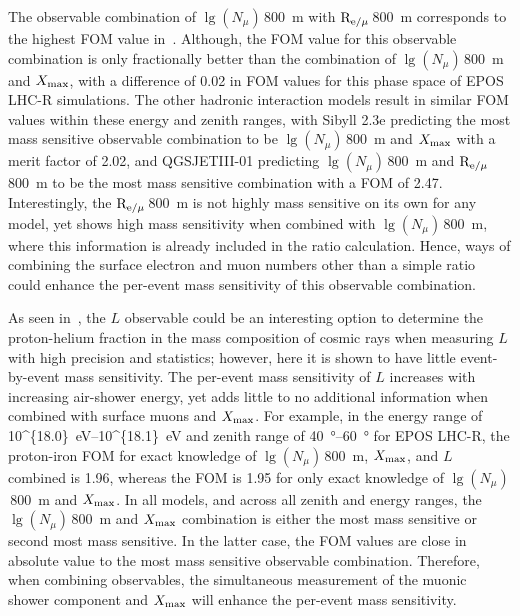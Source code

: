 The observable combination of $\lg\left(N_{\mu}\right)$\,\qty{800}{\meter} with $\rm R_{\rm e/\mu}$\,\qty{800}{\meter} corresponds to the highest FOM value in~.
Although, the FOM value for this observable combination is only fractionally better than the combination of $\lg\left(N_{\mu}\right)$\,\qty{800}{\meter} and $X_{\rm max}$, with a difference of 0.02 in FOM values for this phase space of EPOS LHC-R simulations.
The other hadronic interaction models result in similar FOM values within these energy and zenith ranges, with Sibyll 2.3e predicting the most mass sensitive observable combination to be $\lg\left(N_{\mu}\right)$\,\qty{800}{\meter} and $X_{\rm max}$ with a merit factor of 2.02, and QGSJETIII-01 predicting $\lg\left(N_{\mu}\right)$\,\qty{800}{\meter} and $\rm R_{\rm e/\mu}$\,\qty{800}{\meter} to be the most mass sensitive combination with a FOM of 2.47.
Interestingly, the $\rm R_{\rm e/\mu}$\,\qty{800}{\meter} is not highly mass sensitive on its own for any model, yet shows high mass sensitivity when combined with $\lg\left(N_{\mu}\right)$\,\qty{800}{\meter}, where this information is already included in the ratio calculation.
Hence, ways of combining the surface electron and muon numbers other than a simple ratio could enhance the per-event mass sensitivity of this observable combination.

As seen in~, the $L$ observable could be an interesting option to determine the proton-helium fraction in the mass composition of cosmic rays when measuring $L$ with high precision and statistics; however, here it is shown to have little event-by-event mass sensitivity.
The per-event mass sensitivity of $L$ increases with increasing air-shower energy, yet adds little to no additional information when combined with surface muons and $X_{\rm max}$.
For example, in the energy range of \qtyrange[parse-numbers=false]{10^{18.0}}{10^{18.1}}{\electronvolt} and zenith range of \qtyrange{40}{60}{\degree} for EPOS LHC-R, the proton-iron FOM for exact knowledge of $\lg\left(N_{\mu}\right)$\,\qty{800}{\meter}, $X_{\rm max}$, and $L$ combined is 1.96, whereas the FOM is 1.95 for only exact knowledge of $\lg\left(N_{\mu}\right)$\,\qty{800}{\meter} and $X_{\rm max}$.
In all models, and across all zenith and energy ranges, the $\lg\left(N_{\mu}\right)$\,\qty{800}{\meter} and $X_{\rm max}$ combination is either the most mass sensitive or second most mass sensitive.
In the latter case, the FOM values are close in absolute value to the most mass sensitive observable combination.
Therefore, when combining observables, the simultaneous measurement of the muonic shower component and $X_{\rm max}$ will enhance the per-event mass sensitivity.

